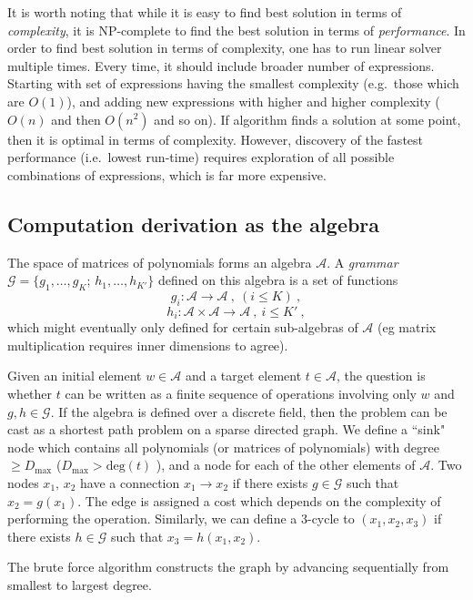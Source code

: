 It is worth noting that while it is easy to find best solution in
terms of {\em complexity}, it is NP-complete to find the best solution
in terms of {\em performance}. In order to find best solution in terms
of complexity, one has to run linear solver multiple times. Every
time, it should include broader number of expressions. Starting with set
of expressions having the smallest complexity (e.g.~those which are
$O(1)$), and adding new expressions with higher and higher complexity
($O(n)$ and then $O(n^2)$ and so on). If algorithm finds a solution at
some point, then it is optimal in terms of complexity. 
However, discovery of the fastest performance (i.e.~lowest
run-time) requires exploration of all possible combinations of expressions,
which is far more expensive.  

\subsection{Computation derivation as the algebra}
The space of matrices of polynomials forms an algebra $\mathcal{A}$.
A \emph{grammar} $\mathcal{G}=\{g_1,\dots,g_{K};\, h_1,\dots, h_{K'}\}$ defined on this algebra is a set of functions
$$g_i : \mathcal{A} \longrightarrow \mathcal{A}~,~(i \leq K)~,$$
$$h_{i} : \mathcal{A} \times \mathcal{A} \longrightarrow \mathcal{A}~, ~i \leq K'~,$$
which might eventually only defined for certain sub-algebras of $\mathcal{A}$ 
(eg matrix multiplication requires inner dimensions to agree). 

Given an initial element $w \in \mathcal{A}$ and a target element $t \in \mathcal{A}$, 
the question is whether $t$ can be written as a finite sequence of operations involving 
only $w$ and $g,h \in \mathcal{G}$.
If the algebra is defined over a discrete field, then the problem can be  
cast as a shortest path problem on a sparse directed graph. 
We define a ``sink" node which contains all polynomials (or matrices of polynomials) with degree $\geq D_{\max}$ 
($D_{\max} > \mbox{deg}(t)$ ), and a node for each of the other elements of $\mathcal{A}$. 
Two nodes $x_1,\,x_2$ have a connection $x_1 \rightarrow x_2$ if there exists $g \in \mathcal{G}$ such that
$x_2 = g(x_1)$. The edge is assigned a cost which depends on the complexity of performing the operation.   
Similarly, we can define a 3-cycle to $(x_1,x_2,x_3)$ if there exists $h \in \mathcal{G}$ such that $x_3 = h(x_1,x_2)$.

The brute force algorithm constructs the graph by advancing sequentially from smallest to largest degree. 


